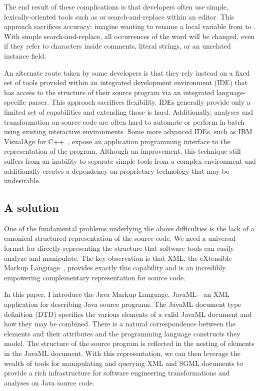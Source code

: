 \documentclass{article}
\begin{document}
\begin{multicols}{2}
The end result of these complications is that developers often use
simple, lexically-oriented tools such as  or
search-and-replace within an editor.  This approach sacrifices accuracy:
imagine wanting to rename a local variable from  to
.  With simple search-and-replace, all occurrences of
the word will be changed, even if they refer to characters inside
comments, literal strings, or an unrelated instance field.

An alternate route taken by some developers is that they rely instead on
a fixed set of tools provided within an integrated development
environment (IDE) that has access to the structure of their source
program via an integrated language-specific parser.  This approach
sacrifices flexibility.  IDEs generally provide only a limited set of
capabilities and extending those is hard.  Additionally, analyses and
transformation on source code are often hard to automate or perform in
batch using existing interactive environments.  Some more advanced IDEs,
such as IBM VisualAge for C++~\cite{Soroker97}, expose an application
programming interface to the representation of the program.  Although an
improvement, this technique still suffers from an inability to separate
simple tools from a complex environment and additionally creates a
dependency on proprietary technology that may be undesirable.

\subsection{A solution}

One of the fundamental problems underlying the above difficulties is the
lack of a canonical structured representation of the source code.  We
need a universal format for directly representing the structure that
software tools can easily analyze and manipulate.  The key observation
is that XML, the eXtensible Markup Language~\cite{XML}, provides exactly
this capability and is an incredibly empowering complementary
representation for source code.

In this paper, I introduce the Java Markup Language, JavaML---an XML
application for describing Java source programs.  The JavaML document
type definition (DTD) specifies the various elements of a valid JavaML
document and how they may be combined.  There is a natural
correspondence between the elements and their attributes and the
programming language constructs they model.  The structure of the source
program is reflected in the nesting of elements in the JavaML document.
With this representation, we can then leverage the wealth of tools for
manipulating and querying XML and SGML documents to provide a rich
infrastructure for software engineering transformations and analyses on
Java source code.


\end{multicols}
\end{document}
